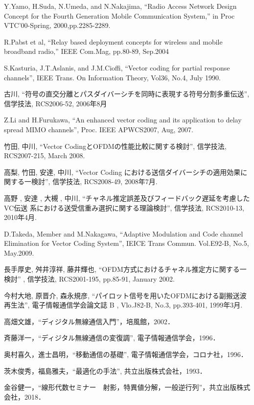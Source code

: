 \begin{thebibliography}{99}
     Y.Yamo, H.Suda, N.Umeda, and N.Nakajima,
    ``Radio Access Network Design Concept for the Fourth Generation Mobile
    Communication System,'' in Proc VTC'00-Spring, 2000,pp.2285-2289.

     R.Pabst et al, 
    “Relay based deployment concepts for wireless and mobile broadband radio,” IEEE
    Com.Mag, pp.80-89, Sep.2004

     S.Kasturia, J.T.Aslanis, and J.M.Cioffi, ``Vector coding for partial
    response channels'', IEEE Trans. On Information Theory, Vol36, No.4, July 1990.

     古川, ``符号の直交分離とパスダイバーシチを同時に表現する符号分割多重伝送'',
    信学技法, RCS2006-52, 2006年8月

     Z.Li and H.Furukawa, ``An enhanced vector coding and its application to delay
    spread MIMO channels'', Proc. IEEE APWCS2007, Aug, 2007.

     竹田, 中川, ``Vector CodingとOFDMの性能比較に関する検討'', 信学技法,
    RCS2007-215, March 2008.

     高梨, 竹田, 安達, 中川, ``Vector Coding における送信ダイバーシチの適用効果に
    関する一検討'', 信学技法, RCS2008-49, 2008年7月.

     高野 , 安達 , 大槻 , 中川, ``チャネル推定誤差及びフィードバック遅延を考慮したVC伝送
    系における送受信重み選択に関する理論検討'', 信学技法, RCS2010-13, 2010年4月.

     D.Takeda, Member and M.Nakagawa, ``Adaptive Modulation and Code channel
    Elimination for Vector Coding System'', IEICE Trans Commun. Vol.E92-B, No.5, May.2009.

     長手厚史, 舛井淳祥, 藤井輝也, ``OFDM方式におけるチャネル推定方に関する一検討''
    , 信学技法, RCS2001-195, pp.85-91, January 2002.

     今村大地, 原晋介, 森永規彦, ``パイロット信号を用いたOFDMにおける副搬送波再生法'',
     電子情報通信学会論文誌 B , Vlo.J82-B, No.3, pp.393-401, 1999年3月.

     高畑文雄，``ディジタル無線通信入門''，培風館，2002．

     斉藤洋一，``ディジタル無線通信の変復調'', 電子情報通信学会，1996．

     奥村喜久，進士昌明，``移動通信の基礎'', 電子情報通信学会，コロナ社，1996．

     茨木俊秀，福島雅夫，``最適化の手法'', 共立出版株式会社，1993．

     金谷健一，``線形代数セミナー　射影，特異値分解，一般逆行列''，共立出版株式会社，2018．
\end{thebibliography}
